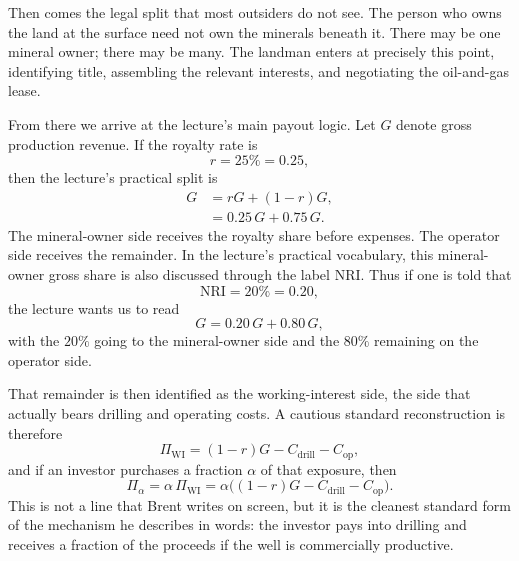 Then comes the legal split that most outsiders do not see. The person who owns the land at the surface need not own the minerals beneath it. There may be one mineral owner; there may be many. The landman enters at precisely this point, identifying title, assembling the relevant interests, and negotiating the oil-and-gas lease.

From there we arrive at the lecture's main payout logic. Let \(G\) denote gross production revenue. If the royalty rate is
\begin{equation}
r = 25\% = 0.25,
\end{equation}
then the lecture's practical split is
\begin{align}
G &= rG + (1-r)G, \\
  &= 0.25\,G + 0.75\,G.
\end{align}
The mineral-owner side receives the royalty share before expenses. The operator side receives the remainder. In the lecture's practical vocabulary, this mineral-owner gross share is also discussed through the label NRI. Thus if one is told that
\begin{equation}
\mathrm{NRI} = 20\% = 0.20,
\end{equation}
the lecture wants us to read
\begin{equation}
G = 0.20\,G + 0.80\,G,
\end{equation}
with the \(20\%\) going to the mineral-owner side and the \(80\%\) remaining on the operator side.

That remainder is then identified as the working-interest side, the side that actually bears drilling and operating costs. A cautious standard reconstruction is therefore
\begin{equation}
\Pi_{\mathrm{WI}} = (1-r)G - C_{\mathrm{drill}} - C_{\mathrm{op}},
\end{equation}
and if an investor purchases a fraction \(\alpha\) of that exposure, then
\begin{equation}
\Pi_{\alpha} = \alpha\,\Pi_{\mathrm{WI}} = \alpha\big((1-r)G - C_{\mathrm{drill}} - C_{\mathrm{op}}\big).
\end{equation}
This is not a line that Brent writes on screen, but it is the cleanest standard form of the mechanism he describes in words: the investor pays into drilling and receives a fraction of the proceeds if the well is commercially productive.

